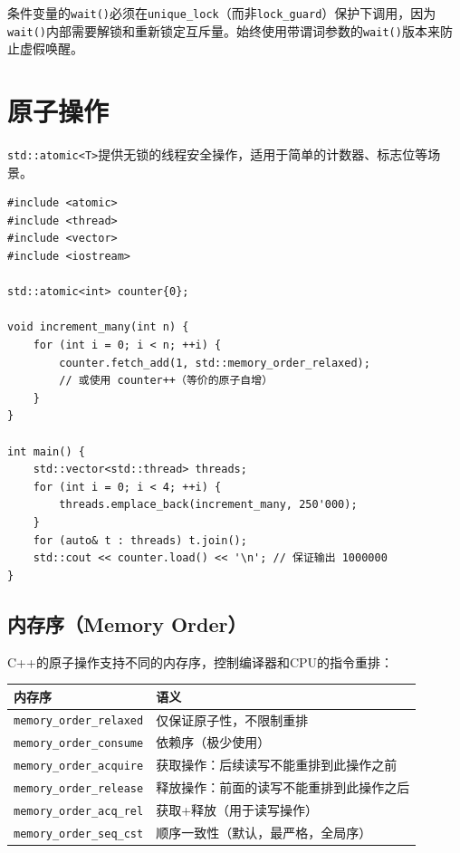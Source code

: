 \documentclass[12pt,a4paper,fontset=fandol]{ctexbook}
\newcommand{\cpp}[1]{C++#1}
\begin{document}
\begin{warning}
条件变量的\texttt{wait()}必须在\texttt{unique\_lock}（而非\texttt{lock\_guard}）保护下调用，因为\texttt{wait()}内部需要解锁和重新锁定互斥量。始终使用带谓词参数的\texttt{wait()}版本来防止虚假唤醒。
\end{warning}

\section{原子操作}

\texttt{std::atomic<T>}提供无锁的线程安全操作，适用于简单的计数器、标志位等场景。

\begin{lstlisting}
#include <atomic>
#include <thread>
#include <vector>
#include <iostream>

std::atomic<int> counter{0};

void increment_many(int n) {
    for (int i = 0; i < n; ++i) {
        counter.fetch_add(1, std::memory_order_relaxed);
        // 或使用 counter++（等价的原子自增）
    }
}

int main() {
    std::vector<std::thread> threads;
    for (int i = 0; i < 4; ++i) {
        threads.emplace_back(increment_many, 250'000);
    }
    for (auto& t : threads) t.join();
    std::cout << counter.load() << '\n'; // 保证输出 1000000
}
\end{lstlisting}

\subsection{内存序（Memory Order）}

\cpp{}的原子操作支持不同的内存序，控制编译器和CPU的指令重排：

\begin{longtable}{lp{8cm}}
\toprule
\textbf{内存序} & \textbf{语义} \\
\midrule
\texttt{memory\_order\_relaxed} & 仅保证原子性，不限制重排 \\
\texttt{memory\_order\_consume} & 依赖序（极少使用） \\
\texttt{memory\_order\_acquire} & 获取操作：后续读写不能重排到此操作之前 \\
\texttt{memory\_order\_release} & 释放操作：前面的读写不能重排到此操作之后 \\
\texttt{memory\_order\_acq\_rel} & 获取+释放（用于读写操作） \\
\texttt{memory\_order\_seq\_cst} & 顺序一致性（默认，最严格，全局序） \\
\bottomrule
\end{longtable}
\end{document}
